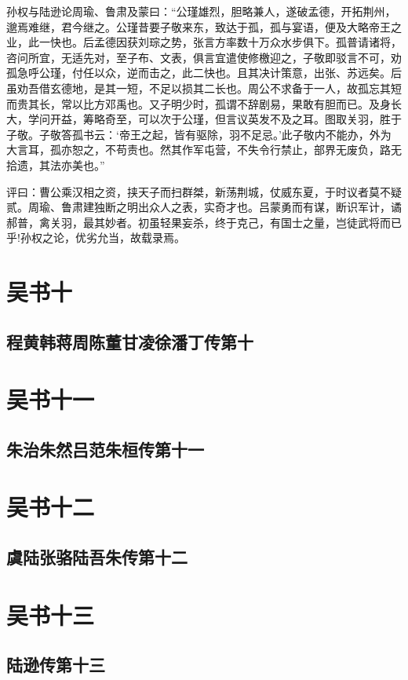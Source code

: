 \documentclass[12pt,UTF8]{ctexbook}
\begin{document}
孙权与陆逊论周瑜、鲁肃及蒙曰：“公瑾雄烈，胆略兼人，遂破孟德，开拓荆州，邈焉难继，君今继之。公瑾昔要子敬来东，致达于孤，孤与宴语，便及大略帝王之业，此一快也。后孟德因获刘琮之势，张言方率数十万众水步俱下。孤普请诸将，咨问所宜，无适先对，至子布、文表，俱言宜遣使修檄迎之，子敬即驳言不可，劝孤急呼公瑾，付任以众，逆而击之，此二快也。且其决计策意，出张、苏远矣。后虽劝吾借玄德地，是其一短，不足以损其二长也。周公不求备于一人，故孤忘其短而贵其长，常以比方邓禹也。又子明少时，孤谓不辞剧易，果敢有胆而已。及身长大，学问开益，筹略奇至，可以次于公瑾，但言议英发不及之耳。图取关羽，胜于子敬。子敬答孤书云：‘帝王之起，皆有驱除，羽不足忌。’此子敬内不能办，外为大言耳，孤亦恕之，不苟责也。然其作军屯营，不失令行禁止，部界无废负，路无拾遗，其法亦美也。”

评曰：曹公乘汉相之资，挟天子而扫群桀，新荡荆城，仗威东夏，于时议者莫不疑贰。周瑜、鲁肃建独断之明出众人之表，实奇才也。吕蒙勇而有谋，断识军计，谲郝普，禽关羽，最其妙者。初虽轻果妄杀，终于克己，有国士之量，岂徒武将而已乎!孙权之论，优劣允当，故载录焉。

\part{吴书十}
\chapter{程黄韩蒋周陈董甘凌徐潘丁传第十}

\part{吴书十一}
\chapter{朱治朱然吕范朱桓传第十一}

\part{吴书十二}
\chapter{虞陆张骆陆吾朱传第十二}

\part{吴书十三}
\chapter{陆逊传第十三}
\end{document}

